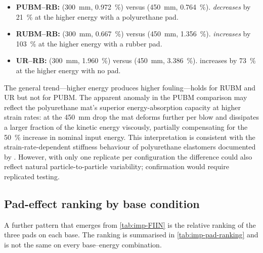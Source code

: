 \begin{itemize}[leftmargin=*,itemsep=4pt]
    \item \textbf{\gls{PUBM}--\gls{RB}:} 
          (\SI{300}{\milli\metre}, \SI{0.972}{\percent}) versus
           (\SI{450}{\milli\metre},
          \SI{0.764}{\percent}). \FIIN{} \emph{decreases} by
          \SI{21}{\percent} at the higher energy with a polyurethane
          pad.
    \item \textbf{\gls{RUBM}--\gls{RB}:} 
          (\SI{300}{\milli\metre}, \SI{0.667}{\percent}) versus
           (\SI{450}{\milli\metre},
          \SI{1.356}{\percent}). \FIIN{} \emph{increases} by
          \SI{103}{\percent} at the higher energy with a rubber pad.
    \item \textbf{\gls{UR}--\gls{RB}:} 
          (\SI{300}{\milli\metre}, \SI{1.960}{\percent}) versus
           (\SI{450}{\milli\metre},
          \SI{3.386}{\percent}). \FIIN{} increases by
          \SI{73}{\percent} at the higher energy with no pad.
\end{itemize}

The general trend---higher energy produces higher fouling---holds for
\gls{RUBM} and \gls{UR} but not for \gls{PUBM}. The apparent anomaly
in the \gls{PUBM} comparison may reflect the polyurethane mat's superior
energy-absorption capacity at higher strain rates: at the
\SI{450}{\milli\metre} drop the mat deforms further per blow and
dissipates a larger fraction of the kinetic energy viscously, partially
compensating for the \SI{50}{\percent} increase in nominal input energy.
This interpretation is consistent with the strain-rate-dependent stiffness
behaviour of polyurethane elastomers documented by \citet{SolSanchez2015}.
However, with only one replicate per configuration the difference could
also reflect natural particle-to-particle variability; confirmation
would require replicated testing.

\subsection{Pad-effect ranking by base condition}
\label{sec:imp-pad-ranking}

A further pattern that emerges from \cref{tab:imp-FIIN} is the relative
ranking of the three pads on each base. The ranking is summarised in
\cref{tab:imp-pad-ranking} and is not the same on every base--energy
combination.


